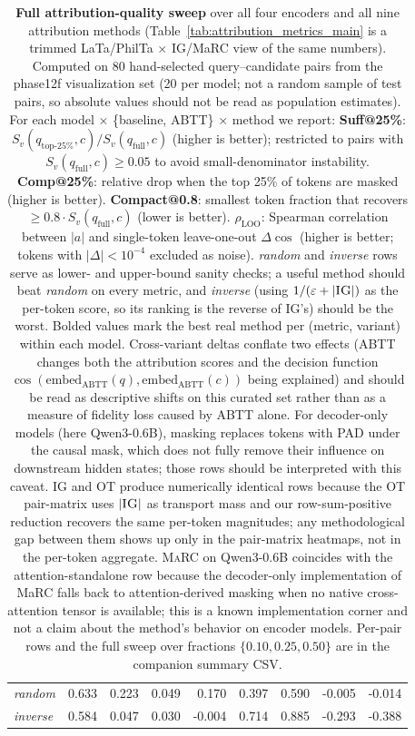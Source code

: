 \begin{table}[t]
\begin{tabular}{lrrrrrrrr}
\textit{random} & 0.633 & 0.223 & 0.049 & 0.170 & 0.397 & 0.590 & -0.005 & -0.014 \\
\textit{inverse} & 0.584 & 0.047 & 0.030 & -0.004 & 0.714 & 0.885 & -0.293 & -0.388 \\
\bottomrule
\end{tabular}
\caption{\textbf{Full attribution-quality sweep} over all four encoders and all nine attribution methods (Table~\ref{tab:attribution_metrics_main} is a trimmed LaTa/PhilTa $\times$ IG/MaRC view of the same numbers). Computed on 80 hand-selected query--candidate pairs from the phase12f visualization set (20 per model; not a random sample of test pairs, so absolute values should not be read as population estimates). For each model $\times$ \{baseline, ABTT\} $\times$ method we report: \textbf{Suff@25\%}: $S_v(q_{\text{top-25\%}}, c) / S_v(q_{\text{full}}, c)$ (higher is better); restricted to pairs with $S_v(q_{\text{full}}, c) \ge 0.05$ to avoid small-denominator instability. \textbf{Comp@25\%}: relative drop when the top 25\% of tokens are masked (higher is better). \textbf{Compact@0.8}: smallest token fraction that recovers $\ge 0.8 \cdot S_v(q_{\text{full}}, c)$ (lower is better). \textbf{$\rho_{\text{LOO}}$}: Spearman correlation between $|a|$ and single-token leave-one-out $\Delta\cos$ (higher is better; tokens with $|\Delta| < 10^{-4}$ excluded as noise). \textit{random} and \textit{inverse} rows serve as lower- and upper-bound sanity checks; a useful method should beat \textit{random} on every metric, and \textit{inverse} (using $1 / (\varepsilon + |\textsc{IG}|)$ as the per-token score, so its ranking is the reverse of \textsc{IG}'s) should be the worst. Bolded values mark the best real method per (metric, variant) within each model. Cross-variant deltas conflate two effects (ABTT changes both the attribution scores and the decision function $\cos(\text{embed}_{\text{ABTT}}(q), \text{embed}_{\text{ABTT}}(c))$ being explained) and should be read as descriptive shifts on this curated set rather than as a measure of fidelity loss caused by ABTT alone. For decoder-only models (here Qwen3-0.6B), masking replaces tokens with PAD under the causal mask, which does not fully remove their influence on downstream hidden states; those rows should be interpreted with this caveat. \textsc{IG} and \textsc{OT} produce numerically identical rows because the \textsc{OT} pair-matrix uses $|\textsc{IG}|$ as transport mass and our row-sum-positive reduction recovers the same per-token magnitudes; any methodological gap between them shows up only in the pair-matrix heatmaps, not in the per-token aggregate. \textsc{MaRC} on Qwen3-0.6B coincides with the attention-standalone row because the decoder-only implementation of MaRC falls back to attention-derived masking when no native cross-attention tensor is available; this is a known implementation corner and not a claim about the method's behavior on encoder models. Per-pair rows and the full sweep over fractions $\{0.10, 0.25, 0.50\}$ are in the companion summary CSV.}
\label{tab:attribution_metrics_appendix}
\end{table}
